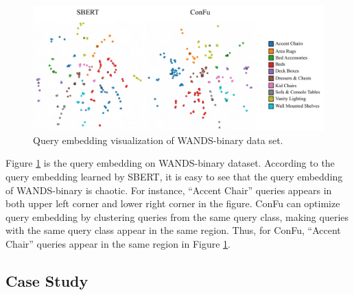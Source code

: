 \begin{figure}[th] 
  \centering
  \includegraphics[width=\columnwidth]{query_vis_3}
  \caption{Query embedding visualization of WANDS-binary data set.}
  \label{wands_query_vis}
\end{figure}

Figure \ref{wands_query_vis} is the query embedding on WANDS-binary dataset. According to the query embedding learned by SBERT, it is easy to see that the query embedding of WANDS-binary is chaotic. For instance, ``Accent Chair'' queries appears in both upper left corner and lower right corner in the figure. ConFu can optimize query embedding by clustering queries from the same query class, making queries with the same query class appear in the same region. Thus, for ConFu, ``Accent Chair'' queries appear in the same region in Figure \ref{wands_query_vis}.


\subsection{Case Study}

